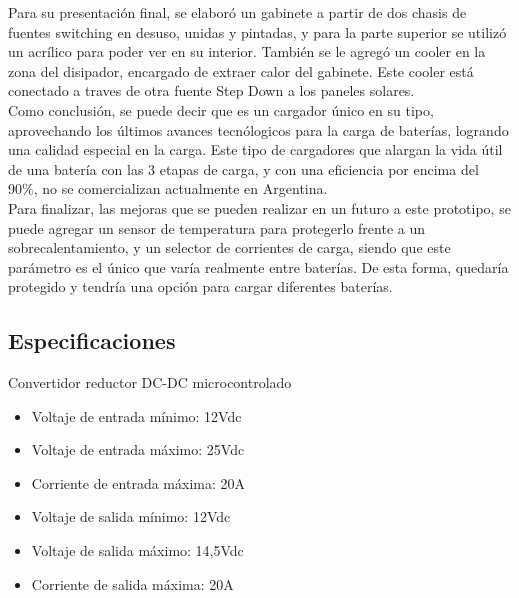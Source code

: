 Para su presentación final, se elaboró un gabinete a partir de dos chasis de fuentes switching en desuso, unidas y pintadas, y para la parte superior se utilizó un acrílico para poder ver en su interior. También se le agregó un cooler en la zona del disipador, encargado de extraer calor del gabinete. Este cooler está conectado a traves de otra fuente Step Down a los paneles solares.\\

Como conclusión, se puede decir que es un cargador único en su tipo, aprovechando los últimos avances tecnólogicos para la carga de baterías, logrando una calidad especial en la carga. Este tipo de cargadores que alargan la vida útil de una batería con las 3 etapas de carga, y con una eficiencia por encima del 90\%, no se comercializan actualmente en Argentina.\\

Para finalizar, las mejoras que se pueden realizar en un futuro a este prototipo, se puede agregar un sensor de temperatura para protegerlo frente a un sobrecalentamiento, y un selector de corrientes de carga, siendo que este parámetro es el único que varía realmente entre baterías. De esta forma, quedaría protegido y tendría una opción para cargar diferentes baterías.\\


\subsection{Especificaciones}

Convertidor reductor DC-DC microcontrolado

\begin{itemize}
    \item Voltaje de entrada mínimo: 12Vdc
    \item Voltaje de entrada máximo: 25Vdc
    \item Corriente de entrada máxima: 20A
    \item Voltaje de salida mínimo: 12Vdc
    \item Voltaje de salida máximo: 14,5Vdc
    \item Corriente de salida máxima: 20A
\end{itemize}
